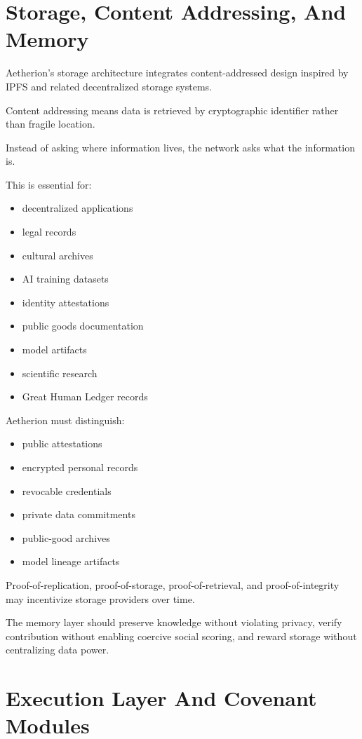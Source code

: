 ﻿\documentclass[12pt]{article}
\begin{document}
\section{Storage, Content Addressing, And Memory}


Aetherion's storage architecture integrates content-addressed design inspired by IPFS and related decentralized storage systems.

Content addressing means data is retrieved by cryptographic identifier rather than fragile location.

Instead of asking where information lives, the network asks what the information is.

This is essential for:

\begin{itemize}
  \item decentralized applications
  \item legal records
  \item cultural archives
  \item AI training datasets
  \item identity attestations
  \item public goods documentation
  \item model artifacts
  \item scientific research
  \item Great Human Ledger records
\end{itemize}

Aetherion must distinguish:

\begin{itemize}
  \item public attestations
  \item encrypted personal records
  \item revocable credentials
  \item private data commitments
  \item public-good archives
  \item model lineage artifacts
\end{itemize}

Proof-of-replication, proof-of-storage, proof-of-retrieval, and proof-of-integrity may incentivize storage providers over time.

The memory layer should preserve knowledge without violating privacy, verify contribution without enabling coercive social scoring, and reward storage without centralizing data power.

\section{Execution Layer And Covenant Modules}
\end{document}

